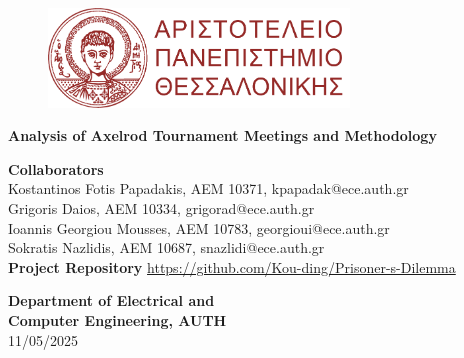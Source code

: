 \documentclass[12pt]{article}
\begin{document}
\begin{titlepage}
    \begin{center}
        \vspace{1cm}

        \begin{figure}[h]
            \centering
            \includegraphics[width=8cm]{media/AUTH_Banner.png}
        \end{figure}
        
        \vspace{2cm}
        \Huge\textbf{Analysis of Axelrod Tournament Meetings and Methodology}\\
        \vspace{2.5cm}

            
        
        \Large\textbf{Collaborators}\\  
        \vspace{0.2cm}
        \large
        Kostantinos Fotis Papadakis, AEM 10371, kpapadak@ece.auth.gr\\ 
        \vspace{0.2cm}
        Grigoris Daios, AEM 10334, grigorad@ece.auth.gr \\  
        \vspace{0.2cm}
        Ioannis Georgiou Mousses, AEM 10783, georgioui@ece.auth.gr  \\  
        \vspace{0.2cm}
        Sokratis Nazlidis, AEM 10687, snazlidi@ece.auth.gr \\  
        \vspace{2cm}
        \Large\textbf{Project Repository}
        \vspace{0.2cm}
        \large\url{https://github.com/Kou-ding/Prisoner-s-Dilemma}
        
        \begin{center}
            \large{\textbf{Department of Electrical and \\ Computer Engineering, AUTH}}\\ 11/05/2025
                
        \end{center}
    \end{center}
\end{titlepage}
\end{document}
